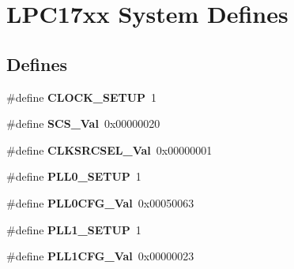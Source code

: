 \hypertarget{group___l_p_c17xx___system___defines}{\section{\-L\-P\-C17xx \-System \-Defines}
\label{group___l_p_c17xx___system___defines}
}
\subsection*{\-Defines}
\begin{DoxyCompactItemize}
\item 
\hypertarget{group___l_p_c17xx___system___defines_gaee2245fb4caf68f0fc571d8b24ff5626}{\#define {\bfseries \-C\-L\-O\-C\-K\-\_\-\-S\-E\-T\-U\-P}~1}\label{group___l_p_c17xx___system___defines_gaee2245fb4caf68f0fc571d8b24ff5626}

\item 
\hypertarget{group___l_p_c17xx___system___defines_gaa643f228c03274d2aad339bf03d55e04}{\#define {\bfseries \-S\-C\-S\-\_\-\-Val}~0x00000020}\label{group___l_p_c17xx___system___defines_gaa643f228c03274d2aad339bf03d55e04}

\item 
\hypertarget{group___l_p_c17xx___system___defines_ga88278330fa4950022fb0e40f6326dca1}{\#define {\bfseries \-C\-L\-K\-S\-R\-C\-S\-E\-L\-\_\-\-Val}~0x00000001}\label{group___l_p_c17xx___system___defines_ga88278330fa4950022fb0e40f6326dca1}

\item 
\hypertarget{group___l_p_c17xx___system___defines_ga1bed52a37381d5af047c718eb816d6ca}{\#define {\bfseries \-P\-L\-L0\-\_\-\-S\-E\-T\-U\-P}~1}\label{group___l_p_c17xx___system___defines_ga1bed52a37381d5af047c718eb816d6ca}

\item 
\hypertarget{group___l_p_c17xx___system___defines_ga600ee717e584c9795c063dc4c35f0dc3}{\#define {\bfseries \-P\-L\-L0\-C\-F\-G\-\_\-\-Val}~0x00050063}\label{group___l_p_c17xx___system___defines_ga600ee717e584c9795c063dc4c35f0dc3}

\item 
\hypertarget{group___l_p_c17xx___system___defines_gadbc3ac191382c94702ee33f95e310659}{\#define {\bfseries \-P\-L\-L1\-\_\-\-S\-E\-T\-U\-P}~1}\label{group___l_p_c17xx___system___defines_gadbc3ac191382c94702ee33f95e310659}

\item 
\hypertarget{group___l_p_c17xx___system___defines_ga033a40a3f959936d90c9a79de85062fb}{\#define {\bfseries \-P\-L\-L1\-C\-F\-G\-\_\-\-Val}~0x00000023}\label{group___l_p_c17xx___system___defines_ga033a40a3f959936d90c9a79de85062fb}


\end{DoxyCompactItemize}
